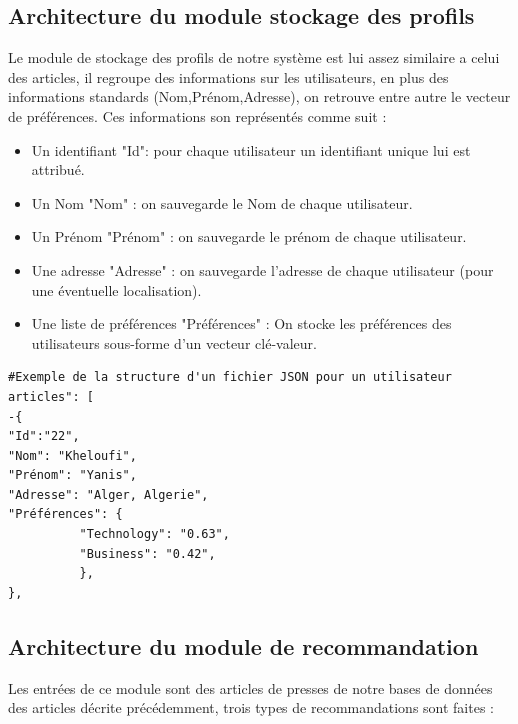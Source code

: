 \subsection{Architecture du module stockage des profils}
Le module de stockage des profils de notre système est lui assez similaire a celui des articles, il regroupe des informations sur les utilisateurs, en plus des informations standards (Nom,Prénom,Adresse), on retrouve entre autre le vecteur de préférences. Ces informations son représentés comme suit :

\begin{itemize}
    
    \item Un identifiant "Id": pour chaque utilisateur un identifiant unique lui est attribué.\\
    
    \item Un Nom "Nom" : on sauvegarde le Nom de chaque utilisateur.\\
    
    \item Un Prénom "Prénom" : on sauvegarde le prénom de chaque utilisateur.\\
    
    \item Une adresse "Adresse" : on sauvegarde l'adresse de chaque utilisateur (pour une éventuelle localisation).\\
    
    \item Une liste de préférences "Préférences" : On stocke les préférences des utilisateurs sous-forme d'un vecteur clé-valeur.\\
    
\end{itemize}

\begin{lstlisting}[style=code]
#Exemple de la structure d'un fichier JSON pour un utilisateur
articles": [
-{
"Id":"22",
"Nom": "Kheloufi",
"Prénom": "Yanis",
"Adresse": "Alger, Algerie",
"Préférences": {
          "Technology": "0.63",
          "Business": "0.42",
          },
},
\end{lstlisting}


\subsection{Architecture du module de recommandation}
Les entrées de ce module sont des articles de presses de notre bases de données des articles décrite précédemment, trois types de recommandations sont faites :\\


